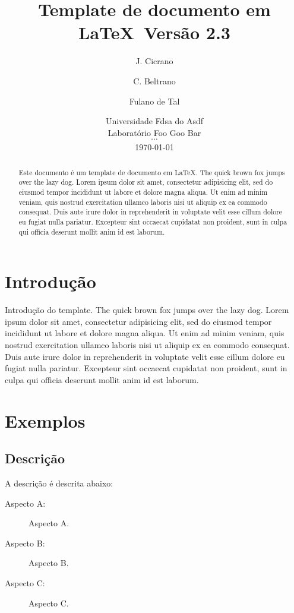 \documentclass[12pt,a4paper]{article}
\title{Template de documento em \LaTeX\ Versão 2.3}
\author{ J. Cicrano \and C. Beltrano \and Fulano de Tal }
\date{
	Universidade Fdsa do Asdf\\
	Laboratório Foo Goo Bar\\
	$\cdots$ \\
	\today
}
\begin{document}
\maketitle

\begin{abstract}
Este documento é um template de documento em \LaTeX. The quick brown fox jumps over the lazy dog.
Lorem ipsum dolor sit amet, consectetur adipisicing elit, sed do eiusmod tempor
incididunt ut labore et dolore magna aliqua. Ut enim ad minim veniam, quis
nostrud exercitation ullamco laboris nisi ut aliquip ex ea commodo consequat.
Duis aute irure dolor in reprehenderit in voluptate velit esse cillum dolore eu
fugiat nulla pariatur. Excepteur sint occaecat cupidatat non proident, sunt in
culpa qui officia deserunt mollit anim id est laborum.
\end{abstract}

\tableofcontents
\pagebreak


\section{Introdução}

Introdução do template. The quick brown fox jumps over the lazy dog. Lorem
ipsum dolor sit amet, consectetur adipisicing elit, sed do eiusmod tempor
incididunt ut labore et dolore magna aliqua. Ut enim ad minim veniam, quis
nostrud exercitation ullamco laboris nisi ut aliquip ex ea commodo consequat.
Duis aute irure dolor in reprehenderit in voluptate velit esse cillum dolore eu
fugiat nulla pariatur. Excepteur sint occaecat cupidatat non proident, sunt in
culpa qui officia deserunt mollit anim id est laborum.


\section{Exemplos}


\subsection{Descrição}

A descrição é descrita abaixo:

\begin{description}
\item[Aspecto A:] Aspecto A.
\item[Aspecto B:] Aspecto B.
\item[Aspecto C:] Aspecto C.
\end{description}
\end{document}
